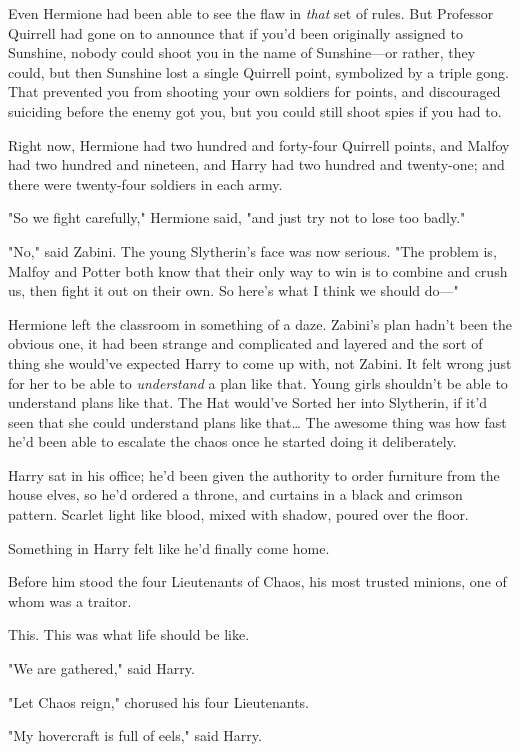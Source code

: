 Even Hermione had been able to see the flaw in \emph{that} set of rules. But 
Professor Quirrell had gone on to announce that if you'd been originally 
assigned to Sunshine, nobody could shoot you in the name of Sunshine---or 
rather, they could, but then Sunshine lost a single Quirrell point, symbolized 
by a triple gong. That prevented you from shooting your own soldiers for 
points, and discouraged suiciding before the enemy got you, but you could still 
shoot spies if you had to.

Right now, Hermione had two hundred and forty-four Quirrell points, and Malfoy 
had two hundred and nineteen, and Harry had two hundred and twenty-one; and 
there were twenty-four soldiers in each army.

"So we fight carefully," Hermione said, "and just try not to lose too badly."

"No," said Zabini. The young Slytherin's face was now serious. "The problem is, 
Malfoy and Potter both know that their only way to win is to combine and crush 
us, then fight it out on their own. So here's what I think we should do---"

Hermione left the classroom in something of a daze. Zabini's plan hadn't been 
the obvious one, it had been strange and complicated and layered and the sort 
of thing she would've expected Harry to come up with, not Zabini. It felt wrong 
just for her to be able to \emph{understand} a plan like that. Young girls 
shouldn't be able to understand plans like that. The Hat would've Sorted her 
into Slytherin, if it'd seen that she could understand plans like that{\ldots}
\sbreak
The awesome thing was how fast he'd been able to escalate the chaos once he 
started doing it deliberately.

Harry sat in his office; he'd been given the authority to order furniture from 
the house elves, so he'd ordered a throne, and curtains in a black and crimson 
pattern. Scarlet light like blood, mixed with shadow, poured over the floor.

Something in Harry felt like he'd finally come home.

Before him stood the four Lieutenants of Chaos, his most trusted minions, one 
of whom was a traitor.

This. This was what life should be like.

"We are gathered," said Harry.

"Let Chaos reign," chorused his four Lieutenants.

"My hovercraft is full of eels," said Harry.

